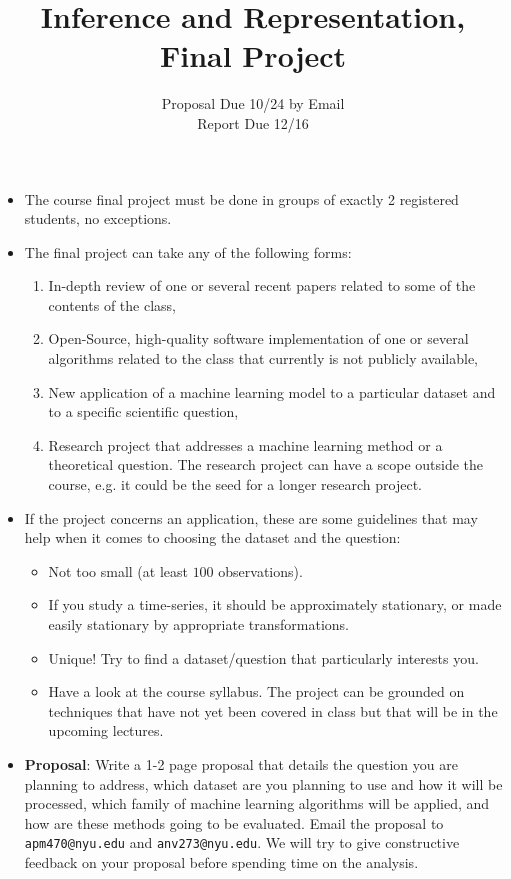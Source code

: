 \documentclass[11pt]{article}
\title{Inference and Representation, Final Project}
\author{Proposal Due 10/24 by Email \\
Report Due 12/16}
\begin{document}
\maketitle

\begin{itemize}
\item The course final project must be done in groups of exactly 2
  registered students, no exceptions.

\item The final project can take any of the following forms:
\begin{enumerate}
\item In-depth review of one or several recent papers related to some of the contents of the class,
\item Open-Source, high-quality software implementation of one or several algorithms related to the class that currently is not publicly available,
\item New application of a machine learning model to a particular dataset and to a specific scientific question,
\item Research project that addresses a machine learning method or a theoretical question. The research project can have a scope outside the course, e.g. it could be the seed for a longer research project.
\end{enumerate}


\item If the project concerns an application, these are some guidelines that may help when it comes to choosing the dataset and the question:
\begin{itemize}
\item Not too small (at least $100$ observations).
\item If you study a time-series, it should be approximately stationary, or made easily stationary by appropriate transformations.
\item Unique! Try to find a dataset/question that particularly interests you. 
\item Have a look at the course syllabus. The project can be grounded on techniques that have not yet been covered in class but that will be in the upcoming lectures.
\end{itemize}

\item \textbf{Proposal}: Write a 1-2 page proposal that details the question you are planning to address, which dataset are you planning to use and how it will be processed, which family of machine learning algorithms will be applied, and how are these methods going to be evaluated.  Email the proposal to \texttt{apm470@nyu.edu} and \texttt{anv273@nyu.edu}. We will try to give constructive feedback on your proposal before spending time on the analysis. 
 

\end{itemize}
\end{document}

